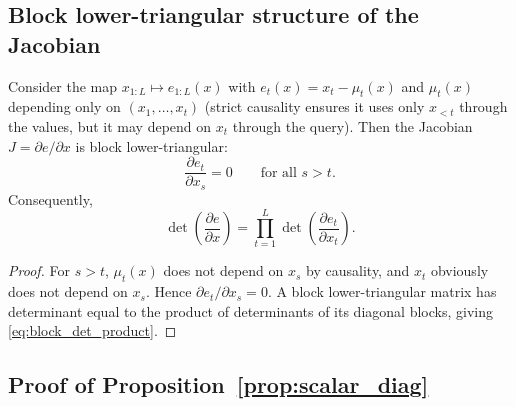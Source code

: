 \documentclass[11pt]{article}
\begin{document}
\subsection{Block lower-triangular structure of the Jacobian}
\label{app:block_triangular}

\begin{lemma}
\label{lem:block_lower_triangular}
Consider the map $x_{1:L}\mapsto e_{1:L}(x)$ with $e_t(x)=x_t-\mu_t(x)$ and
$\mu_t(x)$ depending only on $(x_1,\dots,x_t)$ (strict causality ensures it uses only $x_{<t}$
through the values, but it may depend on $x_t$ through the query).
Then the Jacobian $J=\partial e/\partial x$ is block lower-triangular:
\[
\frac{\partial e_t}{\partial x_s} = 0\qquad\text{for all } s>t.
\]
Consequently,
\begin{equation}
\det\!\left(\frac{\partial e}{\partial x}\right)
=
\prod_{t=1}^L \det\!\left(\frac{\partial e_t}{\partial x_t}\right).
\label{eq:block_det_product}
\end{equation}
\end{lemma}

\begin{proof}
For $s>t$, $\mu_t(x)$ does not depend on $x_s$ by causality, and $x_t$ obviously does not depend on $x_s$.
Hence $\partial e_t/\partial x_s=0$. A block lower-triangular matrix has determinant equal to the
product of determinants of its diagonal blocks, giving \eqref{eq:block_det_product}.
\end{proof}

\subsection{Proof of Proposition~\ref{prop:scalar_diag}}
\label{app:proof_prop_scalar}
\end{document}
